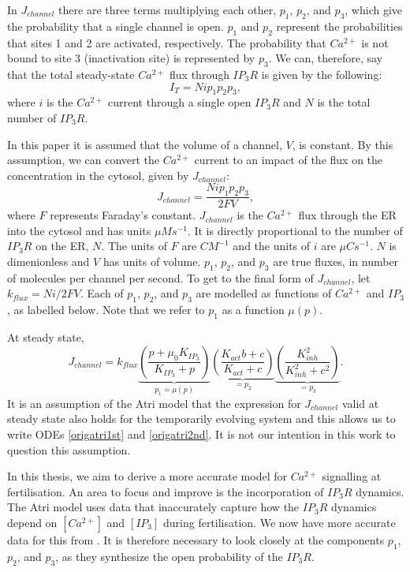 In $J_{channel}$ there are three terms multiplying each other, $p_1$, $p_2$, and $p_3$, which give the probability that a single channel is open. $p_1$ and $p_2$ represent the probabilities that sites 1 and 2 are activated, respectively. The probability that $Ca^{2+}$ is not bound to site 3 (inactivation site) is represented by $p_3$. We can, therefore, say that the total steady-state $Ca^{2+}$ flux through $IP_3R$ is given by the following:
\begin{equation}
    I_T=Nip_1p_2p_3,\nonumber
\end{equation}
where $i$ is the $Ca^{2+}$ current through a single open $IP_3R$ and $N$ is the total number of $IP_3R$.

In this paper it is assumed that the volume of a channel, $V$, is constant. {By this assumption, we can convert the $Ca^{2+}$ current to an impact of the flux on the concentration in the cytosol, given by $J_{channel}$:}
\begin{equation}
J_{channel}=\frac{Nip_1p_2p_3}{2FV},\label{converted}
\end{equation}
where $F$ represents Faraday's constant. {$J_{channel}$ is the $Ca^{2+}$ flux through the ER into the cytosol and has units $\mu Ms^{-1}$. It is directly proportional to the number of $IP_3R$ on the ER, $N$. The units of $F$ are $CM^{-1}$ and the units of $i$ are $\mu Cs^{-1}$. $N$ is dimenionless and $V$ has units of volume. $p_1$, $p_2$, and $p_3$ are true fluxes, in number of molecules per channel per second.}  To get to the final form of $J_{channel}$, let $k_{flux}=Ni/2FV$. Each of $p_1$, $p_2$, and $p_3$ are modelled as functions of $Ca^{2+}$ and ${IP_3}$, as labelled below. Note that we refer to $p_1$ as a function $\mu(p)$.

At steady state,
\begin{equation}
J_{channel}=k_{flux}\underbrace{\left({\frac{p+\mu_0K_{IP_3}}{K_{IP_3}+p}}\right)}_{p_1=\mu(p)}\underbrace{\left(\frac{K_{act}b+c}{K_{act}+c}\right)}_{=p_2}\underbrace{\left(\frac{K_{inh}^2}{K_{inh}^2+c^2}\right)}_{=p_3}.\label{atristeadystate}
\end{equation}
{It is an assumption of the Atri model that the expression for $J_{channel}$ valid at steady state also holds for the temporarily evolving system and this allows us to write ODEs \eqref{origatri1st} and \eqref{origatri2nd}. It is not our intention in this work to question this assumption.}

In this thesis, we aim to derive a more accurate model for $Ca^{2+}$ signalling at fertilisation. An area to focus and improve is the incorporation of $IP_3R$ dynamics. {The Atri model uses data  that inaccurately capture how the $IP_3R$ dynamics depend on $[Ca^{2+}]$ and $[IP_3]$ during fertilisation. We now have more accurate data for this from .} It is therefore necessary to look closely at the components $p_1$, $p_2$, and $p_3$, as they synthesize the open probability of the $IP_3R$.

